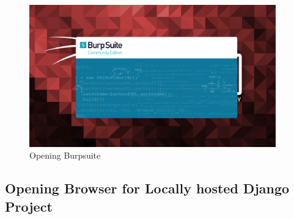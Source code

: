 \documentclass[11pt]{article}
\begin{document}
\begin{figure}[H]
    \centering
    \includegraphics[width=0.95\textwidth]{burpsuite (1).png}
    \caption{Opening Burpsuite}
    \label{fig:1}
\end{figure}
\subsection{Opening Browser for Locally hosted Django Project}



\end{document}
